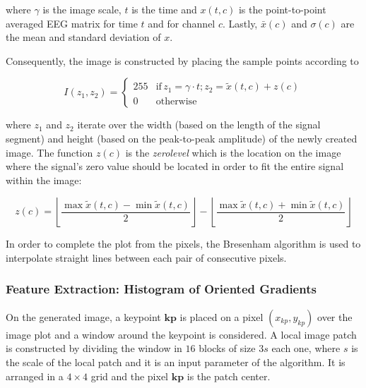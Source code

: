 \documentclass[entropy,article,submit,moreauthors,pdftex,10pt,a4paper]{mdpi}
\begin{document}
\noindent where $\gamma$ is the image scale, $t$ is the time and $ x(t,c) $ is the point-to-point averaged EEG matrix for time $t$ and for  channel $c$. Lastly, $\bar{x}(c)$ and $ \sigma (c) $ are the mean and standard deviation of $x$.

Consequently, the image is constructed by placing the sample points according to

\begin{equation}
I(z_1,z_2) = \left\{ \begin{array}{rl}
255 & \text{if} \,  z_1 = \gamma \cdot t; z_2 = \tilde{x}(t,c) + z(c) \\
0   & \mbox{otherwise}
\end{array}\right.
\label{eq:images}
\end{equation}

\noindent where $ z_1$ and $z_2$ iterate over the width (based on the length of the signal segment) and height (based on the peak-to-peak amplitude) of the newly created image.  The function $z(c)$ is the \textit{zerolevel} which is the location on the image where the signal's zero value should be located in order to fit the entire signal within the image:

\begin{equation}
z(c) = \left \lfloor{ \frac{\max \tilde{x}(t,c)  - \min \tilde{x}(t,c) }{2} }\right \rfloor -   \left \lfloor{ \frac{\max \tilde{x}(t,c)  + \min \tilde{x}(t,c)}{ 2} }\right \rfloor
\label{eq:zerolevel}
\end{equation}
  

In order to complete the plot from the pixels, the Bresenham \citep{Bresenham1965,Ramele2016} algorithm is used to interpolate straight lines between each pair of  consecutive pixels.


\subsubsection{Feature Extraction: Histogram of Oriented Gradients}
\label{SIFT}


On the generated image, a keypoint $\mathbf{kp}$ is placed on a pixel $(x_{kp}, y_{kp})$ over the image plot and a window around the keypoint is considered. A local image patch is constructed by dividing the window in $16$ blocks of size $3s$ each one,  where $s$ is the scale of the local patch and it is an input parameter of the algorithm. It is arranged in a $4 \times 4$ grid and the pixel $ \mathbf{kp}$ is the patch center. 
\end{document}
